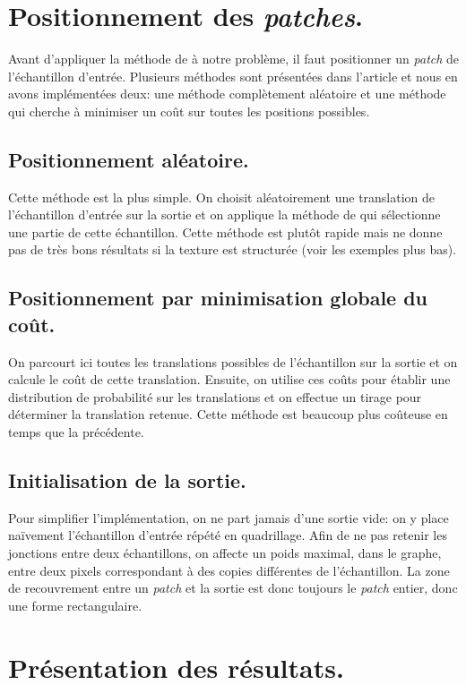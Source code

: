 \documentclass[a4paper, 12pt]{article}
\begin{document}
\section{Positionnement des \emph{patches}.}
Avant d'appliquer la méthode de \grc{} à notre problème, il faut positionner un \emph{patch} de l'échantillon d'entrée.
Plusieurs méthodes sont présentées dans l'article et nous en avons implémentées deux:
une méthode complètement aléatoire et une méthode qui cherche à minimiser un coût sur toutes les positions possibles.

\subsection{Positionnement aléatoire.}
Cette méthode est la plus simple.
On choisit aléatoirement une translation de l'échantillon d'entrée sur la sortie et on applique la méthode de \grc{} qui sélectionne une partie de cette échantillon.
Cette méthode est plutôt rapide mais ne donne pas de très bons résultats si la texture est structurée (voir les exemples plus bas).

\subsection{Positionnement par minimisation globale du coût.}
On parcourt ici toutes les translations possibles de l'échantillon sur la sortie et on calcule le coût de cette translation.
Ensuite, on utilise ces coûts pour établir une distribution de probabilité sur les translations et on effectue un tirage pour déterminer la translation retenue.
Cette méthode est beaucoup plus coûteuse en temps que la précédente.

\subsection{Initialisation de la sortie.}
Pour simplifier l'implémentation, on ne part jamais d'une sortie vide: on y place naïvement l'échantillon d'entrée répété en quadrillage.
Afin de ne pas retenir les jonctions entre deux échantillons, on affecte un poids maximal, dans le graphe, entre deux pixels correspondant à des copies différentes de l'échantillon.
La zone de recouvrement entre un \emph{patch} et la sortie est donc toujours le \emph{patch} entier, donc une forme rectangulaire.


\section{Présentation des résultats.}
\end{document}
